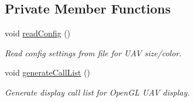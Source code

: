 \subsection*{Private Member Functions}
\begin{DoxyCompactItemize}
\item 
void \hyperlink{class_shadow_uav_display_ae5c9e623f85e9eae3dceb06b34d87a83}{readConfig} ()
\begin{DoxyCompactList}\small\item\em Read config settings from file for UAV size/color. \end{DoxyCompactList}\item 
void \hyperlink{class_shadow_uav_display_a3e229649066ea16f015d41d1a0713eff}{generateCallList} ()
\begin{DoxyCompactList}\small\item\em Generate display call list for OpenGL UAV display. \end{DoxyCompactList}\end{DoxyCompactItemize}
